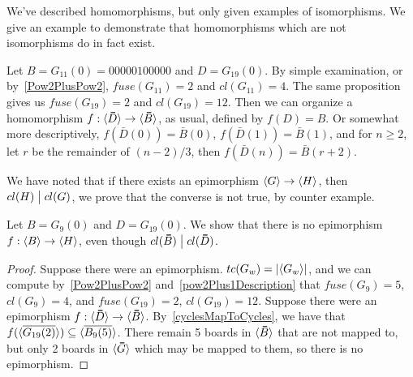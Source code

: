 \documentclass[12pt,letterpaper]{article}
\begin{document}
We've described homomorphisms, but only given examples of isomorphisms. We give an example to demonstrate that homomorphisms which are not isomorphisms do in fact exist.
\begin{example}
  Let $B=G_{11}(0)=00000100000$ and $D=G_{19}(0)$. By simple examination, or by~\cref{Pow2PlusPow2}, $fuse(G_{11})=2$ and $cl(G_{11})=4$. The same proposition gives us $fuse(G_{19})=2$ and $cl(G_{19})=12$. Then we can organize a homomorphism $f:\angled{\bar D}\rightarrow \angled{\bar B}$, as usual, defined by $f(D)=B$. Or somewhat more descriptively, $f(\bar D(0))=\bar B(0)$, $f(\bar D(1))=\bar B(1)$, and for $n\geq 2$, let $r$ be the remainder of $(n-2)/3$, then $f(\bar D(n))=\bar B(r+2)$.
\end{example}

We have noted that if there exists an epimorphism $\langle G\rangle\rightarrow \langle H\rangle$, then $cl(H)\bigm| cl(G)$, we prove that the converse is not true, by counter example.
\begin{prop}\label{divisibilityNotImplyEpi}
  Let $B=G_9(0)$ and $D=G_{19}(0)$. We show that there is no epimorphism $f:\langle B\rangle\rightarrow\langle H\rangle$, even though $cl(\bar B)\divides cl(\bar D)$.
\end{prop}
\begin{proof}
  Suppose there were an epimorphism. $tc(G_w)=\lvert\langle G_w\rangle\rvert$, and we can compute by~\cref{Pow2PlusPow2} and~\cref{pow2Plus1Description} that $fuse(G_9)=5$, $cl(G_9)=4$, and $fuse(G_{19})=2$, $cl(G_{19})=12$. Suppose there were an epimorphism $f:\angled{\bar D}\rightarrow \angled{\bar B}$. By~\cref{cyclesMapToCycles}, we have that $f(\langle\overline{G_{19}(2)}\rangle)\subseteq \langle\overline{B_9(5)}\rangle$. There remain 5 boards in $\angled{\bar B}$ that are not mapped to, but only 2 boards in $\angled{\bar G}$ which may be mapped to them, so there is no epimorphism.
\end{proof}
\end{document}
